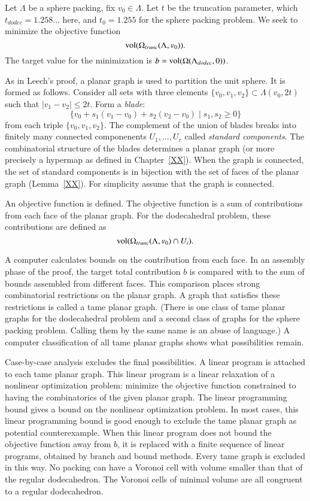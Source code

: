 Let $\Lambda$ be a sphere packing, fix $v_0\in\Lambda$.
Let $t$ be the truncation
parameter, which $t_{dodec}=1.258\ldots$ here, and  $t_0=1.255$ for the
sphere packing problem.  We seek to minimize the objective function 
$$
{\operatorname{vol}}(\Omega_{trunc}(\Lambda,v_0)).
$$
The target value for the minimization is $b={\operatorname{vol}}(\Omega(\Lambda_{dodec},0))$.

As in Leech's proof, a planar graph is used to partition the
unit sphere.  It is formed as follows.  Consider all sets
with three elements $\{v_0,v_1,v_2\}\subset \Lambda(v_0,2t)$
such that $|v_1-v_2|\le 2t$.  Form a {\it blade}:
   $$\{v_0 + s_1 (v_1-v_0) + s_2 (v_2-v_0) \mid s_1,s_2\ge 0\}$$
from each triple $\{v_0,v_1,v_2\}$.  The complement of the union of
blades breaks into finitely many connected componenents  $U_1,\ldots,U_r$
called {\it standard components}.    The combinatorial structure of
the blades determines a planar graph (or more precisely a hypermap as
defined in Chapter~\ref{XX}).  When the graph is connected, the
set of standard components is in bijection with the set of faces of the
planar graph (Lemma~\ref{XX}).  For simplicity assume that the graph
is connected.


An objective function is defined.  The objective function is a sum
of contributions from each face of the planar graph.  For the dodecahedral
problem, these contributions
are defined as $${\operatorname{vol}}(\Omega_{trunc}(\Lambda,v_0)\cap U_i).$$

A computer calculates bounds
on the contribution from each face.  In an assembly phase of the proof, 
the target total contribution $b$
is compared
with to the sum of bounds assembled from different faces. This comparison places
strong combinatorial restrictions on the planar graph.  A graph that satisfies these restrictions is called a tame planar graph.  (There is one class of tame planar graphs for the dodecahedral problem and a second class of graphs for the sphere packing problem. Calling them by the same name is an abuse of language.)  A computer classification of all 
tame planar graphs shows what possibilities remain.   

Case-by-case analysis excludes the final possibilities.  A linear program is
attached to each tame planar graph.  This linear program is a linear relaxation
of a  nonlinear optimization problem: minimize the objective function
 constrained to having the combinatorics of the given planar graph.
The linear programming bound gives a bound on the nonlinear optimization problem. In most cases, this linear programming bound is good enough to exclude
the tame planar graph as potential counterexample.  When this linear program does not  bound the objective function away from $b$, 
it is replaced with a finite sequence of linear
programs, obtained by branch and bound methods.  
Every tame graph is excluded in this way.  
No packing can have a Voronoi cell with volume smaller than that
of the regular dodecahedron.  The Voronoi cells of minimal volume are all
congruent to a regular dodecahedron.


